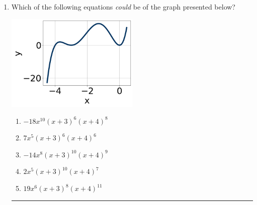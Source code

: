 \documentclass[14pt]{extbook}
\newcommand{\litem}[1]{\item#1\hspace*{-1cm}\rule{\textwidth}{0.4pt}}
\begin{document}
\begin{enumerate}
{\begin{enumerate}[label=\Alph*.]
\end{enumerate} }
\litem{
Which of the following equations \textit{could} be of the graph presented below?
\begin{center}
    \includegraphics[width=0.5\textwidth]{../Figures/polyGraphToFunctionCopyC.png}
\end{center}
\begin{enumerate}[label=\Alph*.]
\item \( -18x^{10} (x + 3)^{6} (x + 4)^{8} \)
\item \( 7x^{5} (x + 3)^{6} (x + 4)^{6} \)
\item \( -14x^{8} (x + 3)^{10} (x + 4)^{9} \)
\item \( 2x^{5} (x + 3)^{10} (x + 4)^{7} \)
\item \( 19x^{6} (x + 3)^{8} (x + 4)^{11} \)

\end{enumerate} }
\end{enumerate}
\end{document}
